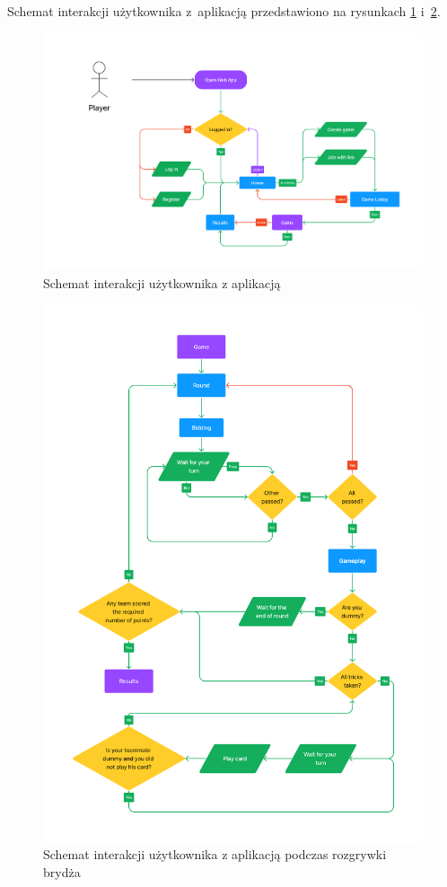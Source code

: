 Schemat interakcji użytkownika z~aplikacją przedstawiono na rysunkach
\ref{fig:flow_user_flow} i~\ref{fig:flow_game_flow}.

\begin{figure}[h]
  \centering
  \includegraphics[width=\textwidth]{img/flow-aplikacji/user_flow.png}
  \caption{Schemat interakcji użytkownika z aplikacją}
  \label{fig:flow_user_flow}
\end{figure}

\begin{figure}[h]
  \centering
  \includegraphics[width=\textwidth]{img/flow-aplikacji/game_flow.png}
  \caption{Schemat interakcji użytkownika z aplikacją podczas rozgrywki brydża}
  \label{fig:flow_game_flow}
\end{figure}

